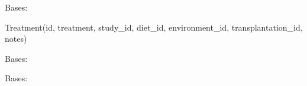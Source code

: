 \documentclass[letterpaper,10pt,english]{sphinxmanual}
\begin{document}
\begin{fulllineitems}
\label{api:mousedb.data.models.Treatment}
Bases: 

Treatment(id, treatment, study\_id, diet\_id, environment\_id, transplantation\_id, notes)

\begin{fulllineitems}
\label{api:mousedb.data.models.Treatment.DoesNotExist}
Bases: 

\end{fulllineitems}


\begin{fulllineitems}
\label{api:mousedb.data.models.Treatment.MultipleObjectsReturned}
Bases: 

\end{fulllineitems}


\begin{fulllineitems}
\label{api:mousedb.data.models.Treatment.animals}
\end{fulllineitems}


\begin{fulllineitems}
\label{api:mousedb.data.models.Treatment.diet}
\end{fulllineitems}


\begin{fulllineitems}
\label{api:mousedb.data.models.Treatment.environment}
\end{fulllineitems}



\end{fulllineitems}
\end{document}
